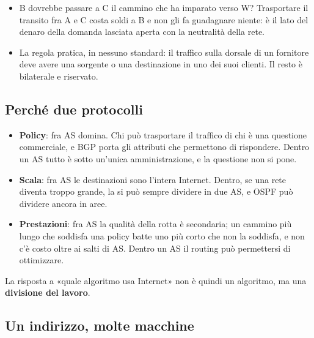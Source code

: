 \begin{itemize}
    \item B dovrebbe passare a C il cammino che ha imparato verso W? Trasportare il transito fra A e C costa soldi a B e non gli fa
          guadagnare niente: è il lato del denaro della domanda lasciata aperta con la neutralità della rete.
    \item La regola pratica, in nessuno standard: il traffico sulla dorsale di un fornitore deve avere una sorgente o una
          destinazione in uno dei suoi clienti. Il resto è bilaterale e riservato.
\end{itemize}

\subsection{Perché due protocolli}

\begin{itemize}
    \item \textbf{Policy}: fra AS domina. Chi può trasportare il traffico di chi è una questione commerciale, e BGP porta gli
          attributi che permettono di rispondere. Dentro un AS tutto è sotto un'unica amministrazione, e la questione non si pone.
    \item \textbf{Scala}: fra AS le destinazioni sono l'intera Internet. Dentro, se una rete diventa troppo grande, la si può
          sempre dividere in due AS, e OSPF può dividere ancora in aree.
    \item \textbf{Prestazioni}: fra AS la qualità della rotta è secondaria; un cammino più lungo che soddisfa una policy batte uno
          più corto che non la soddisfa, e non c'è costo oltre ai salti di AS. Dentro un AS il routing può permettersi di
          ottimizzare.
\end{itemize}
La risposta a «quale algoritmo usa Internet» non è quindi un algoritmo, ma una \textbf{divisione del lavoro}.

\subsection{Un indirizzo, molte macchine}


